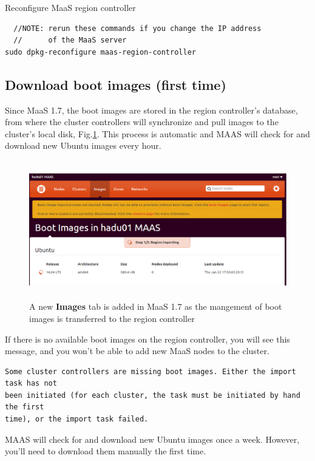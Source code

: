 Reconfigure MaaS region controller
\begin{verbatim}
  //NOTE: rerun these commands if you change the IP address
  //      of the MaaS server
sudo dpkg-reconfigure maas-region-controller
\end{verbatim}

\subsection{Download boot images (first time)}
\label{sec:MaaS_download-boot-images}

Since MaaS 1.7, the boot images are stored in the region controller's database,
from where the cluster controllers will synchronize and pull images to the
cluster's local disk, Fig.\ref{fig:MaaS_Web_UI_maas1.7}. This process is
automatic and MAAS will check for and download new Ubuntu images every hour. 

\begin{figure}[hbt]
  \centerline{\includegraphics[height=6cm,
    angle=0]{./images/MaaS_Web_UI_maas1.7.eps}}
\caption{A new {\bf Images} tab is added in MaaS 1.7 as the mangement of boot
images is transferred to the region controller}
\label{fig:MaaS_Web_UI_maas1.7}
\end{figure}


If there is no available boot images on the region controller, you will see this
message, and you won't be able to add new MaaS nodes to the cluster.
\begin{verbatim}
Some cluster controllers are missing boot images. Either the import task has not
been initiated (for each cluster, the task must be initiated by hand the first
time), or the import task failed.
\end{verbatim}
MAAS will check for and download new Ubuntu images once a week. However, you'll
need to download them manually the first time. 


